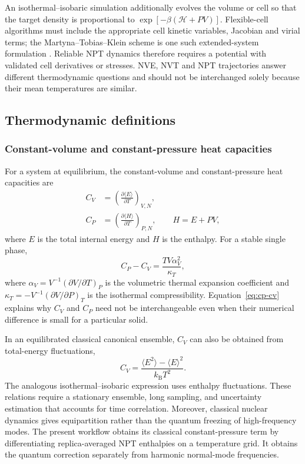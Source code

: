 \documentclass[10pt,a4paper,twocolumn]{article}
\newcommand{\cv}{\ensuremath{C_V}}
\newcommand{\cpheat}{\ensuremath{C_P}}
\begin{document}
An isothermal--isobaric simulation additionally evolves the volume or cell so
that the target density is proportional to
$\exp[-\beta(\mathcal H+PV)]$. Flexible-cell algorithms must include the
appropriate cell kinetic variables, Jacobian and virial terms; the
Martyna--Tobias--Klein scheme is one such extended-system formulation
\cite{mtk}. Reliable NPT dynamics therefore requires a potential with
validated cell derivatives or stresses. NVE, NVT and NPT trajectories answer
different thermodynamic questions and should not be interchanged solely
because their mean temperatures are similar.


\subsection{Thermodynamic definitions}

\subsubsection{Constant-volume and constant-pressure heat capacities}

For a system at equilibrium, the constant-volume and constant-pressure heat
capacities are
\begin{align}
  C_V &= \left(\frac{\partial \langle E\rangle}{\partial T}\right)_{V,N},
  \\
  C_P &= \left(\frac{\partial \langle H\rangle}{\partial T}\right)_{P,N},
  \qquad H=E+PV,
\end{align}
where $E$ is the total internal energy and $H$ is the enthalpy. For a stable
single phase,
\begin{equation}
  C_P-C_V = \frac{TV\alpha_V^2}{\kappa_T},
  \label{eq:cp-cv}
\end{equation}
where $\alpha_V=V^{-1}(\partial V/\partial T)_P$ is the volumetric thermal
expansion coefficient and
$\kappa_T=-V^{-1}(\partial V/\partial P)_T$ is the isothermal compressibility.
Equation~\eqref{eq:cp-cv} explains why \cv{} and \cpheat{} need not be
interchangeable even when their numerical difference is small for a
particular solid.

In an equilibrated classical canonical ensemble, \cv{} can also be obtained
from total-energy fluctuations,
\begin{equation}
  C_V = \frac{\langle E^2\rangle-\langle E\rangle^2}
  {k_{\mathrm B}T^2}.
  \label{eq:fluctuation-cv}
\end{equation}
The analogous isothermal--isobaric expression uses enthalpy fluctuations.
These relations require a stationary ensemble, long sampling, and uncertainty
estimation that accounts for time correlation. Moreover, classical nuclear
dynamics gives equipartition rather than the quantum freezing of
high-frequency modes. The present workflow obtains its classical
constant-pressure term by differentiating replica-averaged NPT enthalpies on a
temperature grid. It obtains the quantum correction separately from harmonic
normal-mode frequencies.
\end{document}

